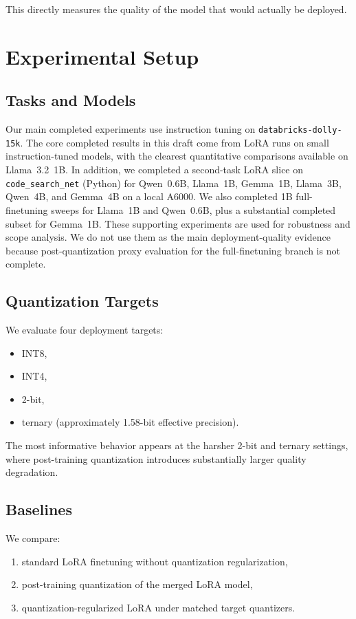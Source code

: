 \documentclass[11pt]{article}
\begin{document}
This directly measures the quality of the model that would actually be deployed.

\section{Experimental Setup}

\subsection{Tasks and Models}

Our main completed experiments use instruction tuning on \texttt{databricks-dolly-15k}. The core completed results in this draft come from LoRA runs on small instruction-tuned models, with the clearest quantitative comparisons available on Llama~3.2~1B. In addition, we completed a second-task LoRA slice on \texttt{code\_search\_net} (Python) for Qwen~0.6B, Llama~1B, Gemma~1B, Llama~3B, Qwen~4B, and Gemma~4B on a local A6000. We also completed 1B full-finetuning sweeps for Llama~1B and Qwen~0.6B, plus a substantial completed subset for Gemma~1B. These supporting experiments are used for robustness and scope analysis. We do not use them as the main deployment-quality evidence because post-quantization proxy evaluation for the full-finetuning branch is not complete.

\subsection{Quantization Targets}

We evaluate four deployment targets:
\begin{itemize}
    \item INT8,
    \item INT4,
    \item 2-bit,
    \item ternary (approximately 1.58-bit effective precision).
\end{itemize}

The most informative behavior appears at the harsher 2-bit and ternary settings, where post-training quantization introduces substantially larger quality degradation.

\subsection{Baselines}

We compare:
\begin{enumerate}
    \item standard LoRA finetuning without quantization regularization,
    \item post-training quantization of the merged LoRA model,
    \item quantization-regularized LoRA under matched target quantizers.
\end{enumerate}
\end{document}
